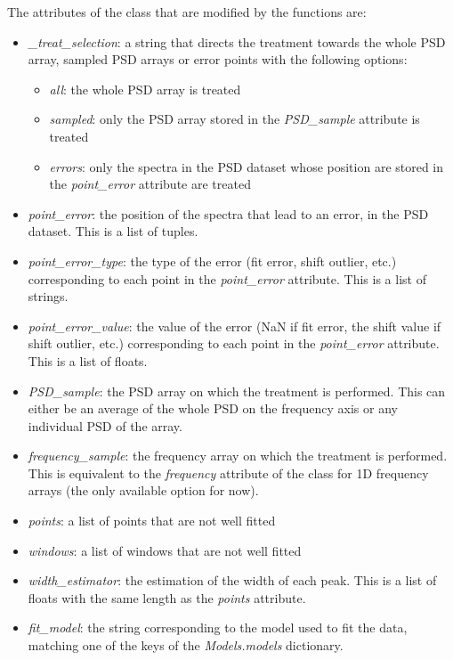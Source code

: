 The attributes of the class that are modified by the functions are:
\begin{itemize}
    \item \textit{\_treat\_selection}: a string that directs the treatment towards the whole PSD array, sampled PSD arrays or error points with the following options:
        \begin{itemize}
            \item \textit{all}: the whole PSD array is treated
            \item \textit{sampled}: only the PSD array stored in the \textit{PSD\_sample} attribute is treated
            \item \textit{errors}: only the spectra in the PSD dataset whose position are stored in the \textit{point\_error} attribute are treated
        \end{itemize}
    \item \textit{point\_error}: the position of the spectra that lead to an error, in the PSD dataset. This is a list of tuples.
    \item \textit{point\_error\_type}: the type of the error (fit error, shift outlier, etc.) corresponding to each point in the \textit{point\_error} attribute. This is a list of strings.
    \item \textit{point\_error\_value}: the value of the error (NaN if fit error, the shift value if shift outlier, etc.) corresponding to each point in the \textit{point\_error} attribute. This is a list of floats.
    \item \textit{PSD\_sample}: the PSD array on which the treatment is performed. This can either be an average of the whole PSD on the frequency axis or any individual PSD of the array.
    \item \textit{frequency\_sample}: the frequency array on which the treatment is performed. This is equivalent to the \textit{frequency} attribute of the class for 1D frequency arrays (the only available option for now).
    \item \textit{points}: a list of points that are not well fitted
    \item \textit{windows}: a list of windows that are not well fitted
    \item \textit{width\_estimator}: the estimation of the width of each peak. This is a list of floats with the same length as the \textit{points} attribute.
    \item \textit{fit\_model}: the string corresponding to the model used to fit the data, matching one of the keys of the \textit{Models.models} dictionary.

\end{itemize}
